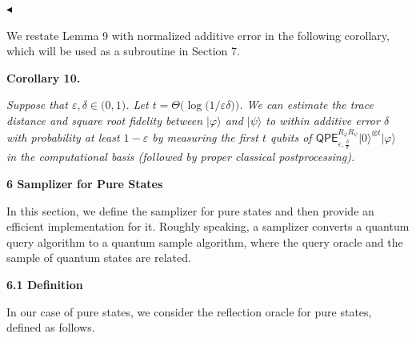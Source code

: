 $\blacktriangleleft$\par




We restate Lemma 9 with normalized additive error in the following corollary, which will be used as a subroutine in Section 7.\par





\par\medskip\noindent\textbf{
\textbf{Corollary 10}\textbf{.}
}\par



\emph{Suppose that $\varepsilon,\delta\in\lparen 0,1\rparen$. Let $t=\Theta\lparen\log\lparen 1/\varepsilon\delta\rparen\rparen$.
We can estimate the trace distance and square root fidelity between $\lvert\varphi\rangle$ and $\lvert\psi\rangle$ to within additive error $\delta$ with probability at least $1-\varepsilon$ by measuring the first $t$ qubits of
$\mathsf{QPE}_{\varepsilon,\frac{\delta}{\pi}}^{R_{\varphi}R_{\psi}}\lvert 0\rangle^{\otimes t}\lvert\varphi\rangle$ in the computational basis (followed by proper classical postprocessing).}\par









\par\medskip\noindent\textbf{
6 Samplizer for Pure States}\par




In this section, we define the samplizer for pure states and then provide an efficient implementation for it.
Roughly speaking,
a samplizer converts a quantum query algorithm to a quantum sample algorithm,
where the query oracle and the sample of quantum states are related.\par




\par\medskip\noindent\textbf{
6.1 Definition}\par




In our case of pure states, we consider the reflection oracle for pure states, defined as follows.\par



